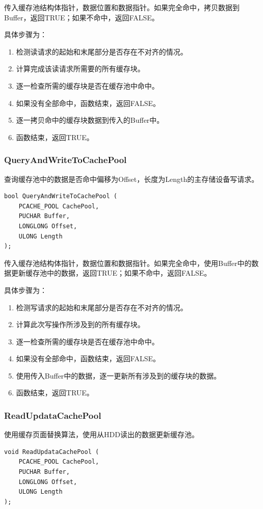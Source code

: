 传入缓存池结构体指针，数据位置和数据指针。如果完全命中，拷贝数据到Buffer，返回TRUE；如果不命中，返回FALSE。

具体步骤为：
\begin{enumerate}
\item 检测读请求的起始和末尾部分是否存在不对齐的情况。
\item 计算完成该读请求所需要的所有缓存块。
\item 逐一检查所需的缓存块是否在缓存池中命中。
\item 如果没有全部命中，函数结束，返回FALSE。
\item 逐一拷贝命中的缓存块数据到传入的Buffer中。
\item 函数结束，返回TRUE。
\end{enumerate}

\subsubsection{QueryAndWriteToCachePool}
查询缓存池中的数据是否命中偏移为Offset，长度为Length的主存储设备写请求。
\begin{lstlisting}
bool QueryAndWriteToCachePool (
    PCACHE_POOL CachePool,
    PUCHAR Buffer,
    LONGLONG Offset,
    ULONG Length
);
\end{lstlisting}

传入缓存池结构体指针，数据位置和数据指针。如果完全命中，使用Buffer中的数据更新缓存池中的数据，返回TRUE；如果不命中，返回FALSE。

具体步骤为：
\begin{enumerate}
\item 检测写请求的起始和末尾部分是否存在不对齐的情况。
\item 计算此次写操作所涉及到的所有缓存块。
\item 逐一检查所需的缓存块是否在缓存池中命中。
\item 如果没有全部命中，函数结束，返回FALSE。
\item 使用传入Buffer中的数据，逐一更新所有涉及到的缓存块的数据。
\item 函数结束，返回TRUE。
\end{enumerate}

\subsubsection{ReadUpdataCachePool}
使用缓存页面替换算法，使用从HDD读出的数据更新缓存池。
\begin{lstlisting}
void ReadUpdataCachePool (
    PCACHE_POOL CachePool,
    PUCHAR Buffer,
    LONGLONG Offset,
    ULONG Length
);
\end{lstlisting}

